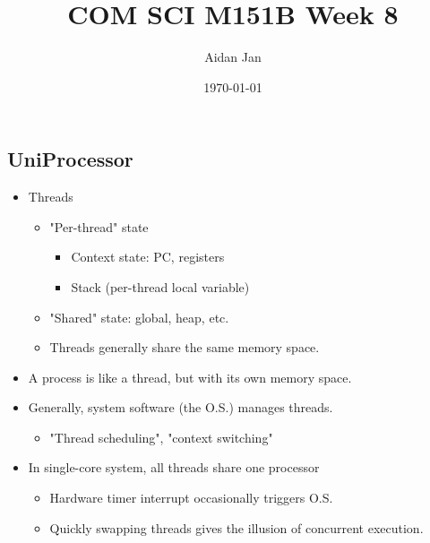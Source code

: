 \documentclass[10pt]{article}
\title{COM SCI M151B Week 8}
\author{Aidan Jan}
\date{\today}
\begin{document}
\maketitle

\subsection*{UniProcessor}
\begin{itemize}
    \item Threads
    \begin{itemize}
        \item "Per-thread" state
        \begin{itemize}
            \item Context state: PC, registers
            \item Stack (per-thread local variable)
        \end{itemize}
        \item "Shared" state: global, heap, etc.
        \item Threads generally share the same memory space.
    \end{itemize}
    \item A process is like a thread, but with its own memory space.
    \item Generally, system software (the O.S.) manages threads.
    \begin{itemize}
        \item "Thread scheduling", "context switching"
    \end{itemize}
    \item In single-core system, all threads share one processor
    \begin{itemize}
        \item Hardware timer interrupt occasionally triggers O.S.
        \item Quickly swapping threads gives the illusion of concurrent execution.
    \end{itemize}
\end{itemize}
\end{document}
